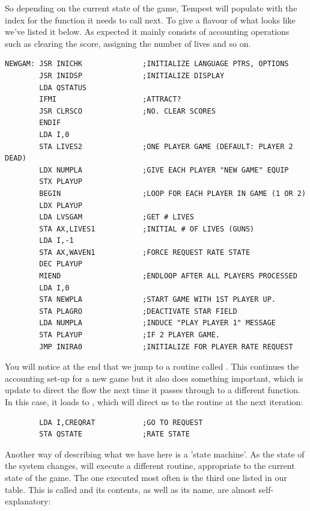 So depending on the current state of the game, Tempest will populate  with the index for the function it needs
to call next. To give a flavour of what  looks like we've listed it below. As expected it mainly consists of 
accounting operations such as clearing the score, assigning the number of lives and so on. 

\begin{lstlisting}
NEWGAM: JSR INICHK              ;INITIALIZE LANGUAGE PTRS, OPTIONS
        JSR INIDSP              ;INITIALIZE DISPLAY
        LDA QSTATUS
        IFMI                    ;ATTRACT?
        JSR CLRSCO              ;NO. CLEAR SCORES
        ENDIF
        LDA I,0
        STA LIVES2              ;ONE PLAYER GAME (DEFAULT: PLAYER 2 DEAD)
        LDX NUMPLA              ;GIVE EACH PLAYER "NEW GAME" EQUIP
        STX PLAYUP
        BEGIN                   ;LOOP FOR EACH PLAYER IN GAME (1 OR 2)
        LDX PLAYUP
        LDA LVSGAM              ;GET # LIVES
        STA AX,LIVES1           ;INITIAL # OF LIVES (GUNS)
        LDA I,-1
        STA AX,WAVEN1           ;FORCE REQUEST RATE STATE
        DEC PLAYUP
        MIEND                   ;ENDLOOP AFTER ALL PLAYERS PROCESSED
        LDA I,0
        STA NEWPLA              ;START GAME WITH 1ST PLAYER UP.
        STA PLAGRO              ;DEACTIVATE STAR FIELD
        LDA NUMPLA              ;INDUCE "PLAY PLAYER 1" MESSAGE
        STA PLAYUP              ;IF 2 PLAYER GAME.
        JMP INIRA0              ;INITIALIZE FOR PLAYER RATE REQUEST
\end{lstlisting}

You will notice at the end that we jump to a routine called . This continues the accounting set-up for a new
game but it also does something important, which is update  to direct the flow the next time it passes through
 to a different function. In this case, it loads  to , which will direct us to the routine
 at the next iteration:
\begin{lstlisting}
        LDA I,CREQRAT           ;GO TO REQUEST
        STA QSTATE              ;RATE STATE
\end{lstlisting}

Another way of describing what we have here is a 'state machine'. As the state of the system changes,  will execute
a different routine, appropriate to the current state of the game. The one executed most often is the third one listed in our
 table. This is called  and its contents, as well as its name, are almost self-explanatory:

